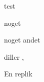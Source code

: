 \begin{Sang}[noget]{test}

	\begin{Lydeffekter}
		\item noget
		\item noget andet
	\end{Lydeffekter}



	\begin{Regi}
		diller  , \fuldscene{}
	\end{Regi}

	\begin{Replik}[B]
		 En replik
	\end{Replik}

\end{Sang}

